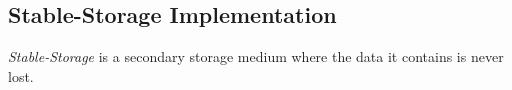 \subsection{Stable-Storage Implementation}\label{subsec:Stable_Storage_Implementation}
\begin{definition}\label{def:Stable_Storage}
  \emph{Stable-Storage} is a secondary storage medium where the data it contains is never lost.
\end{definition}



